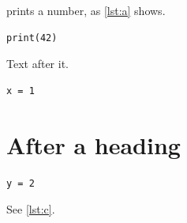 \documentclass{article}
\begin{document}
 prints a number, as \cref{lst:a} shows.
\begin{lstlisting}[caption={Printing a number},label={lst:a}]
print(42)
\end{lstlisting}
Text after it.
\begin{lstlisting}[caption={Two}]
x = 1
\end{lstlisting}
\section{After a heading}
\begin{lstlisting}[caption={Three},label={lst:c}]
y = 2
\end{lstlisting}
See \cref{lst:c}.
\end{document}
